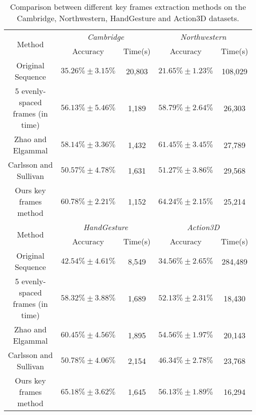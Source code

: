 \documentclass[5p]{elsarticle}
\begin{document}
\begin{table*}[!t]
	\centering
	\caption{Comparison between different key frames extraction methods on the Cambridge, Northwestern, HandGesture and Action3D datasets.}
\begin{tabular}{c|cc|cc}
		\hline
		\multirow{2}{*}{Method}    & \multicolumn{2}{|c|}{\emph{Cambridge}} & \multicolumn{2}{|c}{\emph{Northwestern}}  \\ \cline{2-5}
		& Accuracy                     & Time(s)  & Accuracy          & Time(s)  \\ \hline
		Original Sequence                                                & $35.26\% \pm 3.15\%$  & 20,803   & $21.65\% \pm 1.23\%$  & 108,029  \\
		5  evenly-spaced frames (in time)                        & $56.13\% \pm 5.46\%$  & 1,189      & $58.79\% \pm 2.64\%$  & 26,303   \\
		Zhao and Elgammal \cite{zhao2008information}  & $58.14\% \pm 3.36\%$      & 1,432    & $61.45\% \pm 3.45\%$  & 27,789   \\
		Carlsson and Sullivan \cite{carlsson2001action}   & $50.57\% \pm 4.78\%$      & 1,631    & $51.27\% \pm 3.86\%$  & 29,568   \\ \hline
		Ours key frames method                                      & $60.78\% \pm 2.21\%$       & 1,152    & $64.24\% \pm 2.15\%$  & 25,214   \\ \hline \hline
		
		\multirow{2}{*}{Method}    & \multicolumn{2}{|c|}{\emph{HandGesture}} & \multicolumn{2}{|c}{\emph{Action3D}} \\ \cline{2-5}
		& Accuracy                    & Time(s) &  Accuracy           & Time(s) \\ \hline
		Original Sequence                                                & $42.54\% \pm 4.61\%$ & 8,549   &  $34.56\% \pm 2.65\%$ & 284,489 \\
		5  evenly-spaced frames (in time)                         & $58.32\% \pm 3.88\%$ & 1,689   &  $52.13\% \pm 2.31\%$ & 18,430 \\
		Zhao and Elgammal \cite{zhao2008information}   & $60.45\% \pm 4.56\%$ & 1,895   &  $54.56\% \pm 1.97\%$ & 20,143  \\
		Carlsson and Sullivan  \cite{carlsson2001action}   & $50.78\% \pm 4.06\%$ & 2,154   &  $46.34\% \pm 2.78\%$ & 23,768  \\ \hline
		Ours key frames method                                       & $65.18\% \pm 3.62\%$ & 1,645   &  $56.13\% \pm 1.89\%$ & 16,294 \\ \hline
	\end{tabular}
	\label{Tab:Comparison_key_or_not}
\end{table*}
\end{document}
